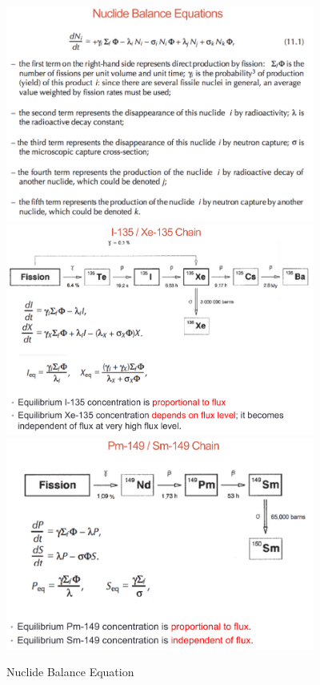 \documentclass{school-22.211-notes}
\begin{document}
\clearpage
\begin{figure}[ht]
  \centering
  \includegraphics[width=4in]{images/dfs/nuclide-balance-equation.png}
  \includegraphics[width=4in]{images/dfs/I-Xe.png}
  \includegraphics[width=4in]{images/dfs/Pm-Sm.png}
  \caption{Nuclide Balance Equation} \label{nbe} 
\end{figure}
\end{document}
